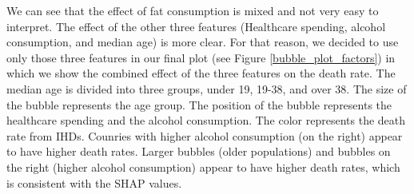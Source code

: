 We can see that the effect of fat consumption is mixed and not very easy to interpret. The effect of the other three features 
(Healthcare spending, alcohol consumption, and median age) is more clear. For that reason, we decided to use only those three features in our final plot 
(see Figure \ref{bubble_plot_factors}) in which we show the combined effect of the three features on the death rate. The median age is divided into three groups, under 19, 19-38, and over 38. The size of the bubble represents the age group. The position of the bubble represents the healthcare spending and the alcohol consumption. The color represents the death rate from IHDs.
Counries with higher alcohol consumption (on the right) appear to have higher death rates.
Larger bubbles (older populations) and bubbles on the right (higher alcohol consumption) appear to have higher death rates, which is consistent with the SHAP values.

